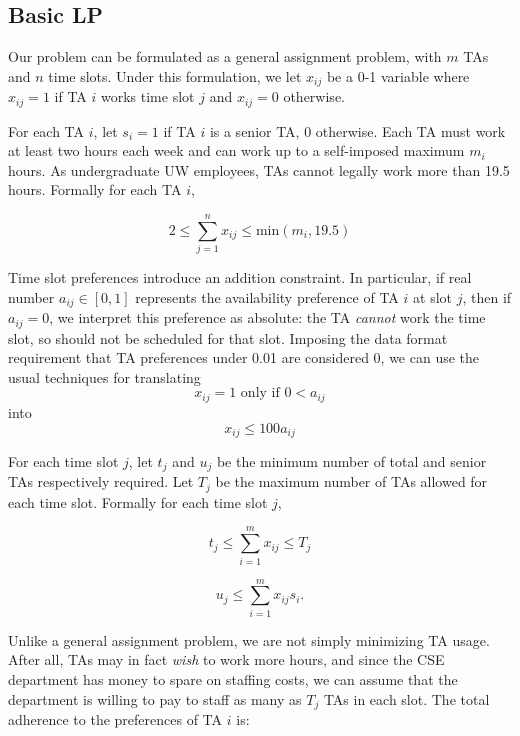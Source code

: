 \documentclass{article}
\begin{document}
\begin{multicols}{2}
\section*{Basic LP}
Our problem can be formulated as a general assignment problem, with $m$ TAs and $n$ time slots. Under this formulation, we let $x_{ij}$ be a 0-1 variable where $x_{ij} = 1$ if TA $i$ works time slot $j$ and $x_{ij} = 0$ otherwise.

For each TA $i$, let $s_i = 1$ if TA $i$ is a senior TA, 0 otherwise. Each TA must work at least two hours each week and can work up to a self-imposed maximum $m_i$ hours. As undergraduate UW employees, TAs cannot legally work more than 19.5 hours. Formally for each TA $i$,

\begin{equation}
2 \leq \sum_{j=1}^{n}x_{ij} \leq \textrm{min}(m_i, 19.5)
\end{equation}

Time slot preferences introduce an addition constraint. In particular, if real number $a_{ij} \in [0,1]$ represents the availability preference of TA $i$ at slot $j$, then if $a_{ij} = 0$, we interpret this preference as absolute: the TA \textit{cannot} work the time slot, so should not be scheduled for that slot. Imposing the data format requirement that TA preferences under 0.01 are considered 0, we can use the usual techniques for translating
\begin{equation}
x_{ij} = 1 \textrm{ only if } 0 < a_{ij}
\end{equation}
into
\begin{equation}
x_{ij} \leq 100 a_{ij}
\end{equation}

For each time slot $j$, let $t_j$ and $u_j$ be the minimum number of total and senior TAs respectively required. Let $T_j$ be the maximum number of TAs allowed for each time slot. Formally for each time slot $j$,

\begin{equation}
t_j \leq \sum_{i=1}^{m}x_{ij} \leq T_j
\end{equation}

\begin{equation}
u_j \leq \sum_{i=1}^{m}x_{ij}s_i.
\end{equation}

Unlike a general assignment problem, we are not simply minimizing TA usage. After all, TAs may in fact \textit{wish} to work more hours, and since the CSE department has money to spare on staffing costs, we can assume that the department is willing to pay to staff as many as $T_j$ TAs in each slot. The total adherence to the preferences of TA $i$ is:


\end{multicols}
\end{document}
